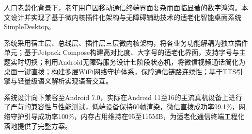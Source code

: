 人口老龄化背景下，老年用户因移动通信终端界面复杂而面临显著的数字鸿沟。本文设计并实现了基于微内核插件化架构与无障碍辅助技术的适老化智能桌面系统SimpleDesktop。

系统采用宿主层、总线层、插件层三层微内核架构，将各业务功能解耦为独立插件单元；基于Jetpack Compose构建高对比度、大字号的适老化界面，支持字号与主题实时切换；利用Android无障碍服务设计七阶段状态机，将微信视频通话简化为桌面一键直拨；构建多层WiFi网络守护体系，保障通信链路连续性；基于TTS引擎与轻量级语义解析实现语音交互。

系统设计向下兼容至Android 7.0，实际在Android 11至16的主流真机设备上进行了严苛的兼容性与性能测试，低端设备保持60帧渲染，微信直拨成功率99.1\%，网络守护引导成功率100\%，内存占用维持在95至115MB，为适老化通信终端工程化落地提供了完整方案。

